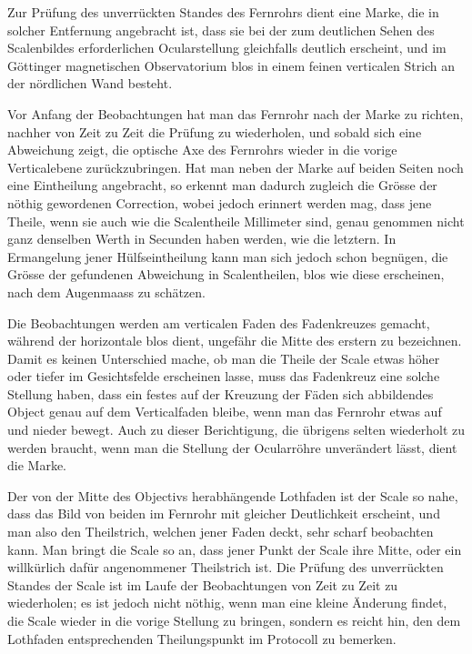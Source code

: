 Zur Prüfung des unverrückten Standes des Fernrohrs dient eine Marke, die in solcher Entfernung angebracht ist, dass sie bei der zum deutlichen Sehen des Scalenbildes erforderlichen Ocularstellung gleichfalls deutlich erscheint, und im Göttinger magnetischen Observatorium blos in einem feinen verticalen Strich an der nördlichen Wand besteht.

Vor Anfang der Beobachtungen hat man das Fernrohr nach der Marke zu richten, nachher von Zeit zu Zeit die Prüfung zu wiederholen, und sobald sich eine Abweichung zeigt, die optische Axe des Fernrohrs wieder in die vorige Verticalebene zurückzubringen. Hat man neben der Marke auf beiden Seiten noch eine Eintheilung angebracht, so erkennt man dadurch zugleich die Grösse der nöthig gewordenen Correction, wobei jedoch erinnert werden mag, dass jene Theile, wenn sie auch wie die Scalentheile Millimeter sind, genau genommen nicht ganz denselben Werth in Secunden haben werden, wie die letztern. In Ermangelung jener Hülfseintheilung kann man sich jedoch schon begnügen, die Grösse der gefundenen Abweichung in Scalentheilen, blos wie diese erscheinen, nach dem Augenmaass zu schätzen.

Die Beobachtungen werden am verticalen Faden des Fadenkreuzes gemacht, während der horizontale blos dient, ungefähr die Mitte des erstern zu bezeichnen. Damit es keinen Unterschied mache, ob man die Theile der Scale etwas höher oder tiefer im Gesichtsfelde erscheinen lasse, muss das Fadenkreuz eine solche Stellung haben, dass ein festes auf der Kreuzung der Fäden sich abbildendes Object genau auf dem Verticalfaden bleibe, wenn man das Fernrohr etwas auf und nieder bewegt. Auch zu dieser Berichtigung, die übrigens selten wiederholt zu werden braucht, wenn man die Stellung der Ocularröhre unverändert lässt, dient die Marke.

Der von der Mitte des Objectivs herabhängende Lothfaden ist der Scale so nahe, dass das Bild von beiden im Fernrohr mit gleicher Deutlichkeit erscheint, und man also den Theilstrich, welchen jener Faden deckt, sehr scharf beobachten kann. Man bringt die Scale so an, dass jener Punkt der Scale ihre Mitte, oder ein willkürlich dafür angenommener Theilstrich ist. Die Prüfung des unverrückten Standes der Scale ist im Laufe der Beobachtungen von Zeit zu Zeit zu wiederholen; es ist jedoch nicht nöthig, wenn man eine kleine Änderung findet, die Scale wieder in die vorige Stellung zu bringen, sondern es reicht hin, den dem Lothfaden entsprechenden Theilungspunkt im Protocoll zu bemerken.

